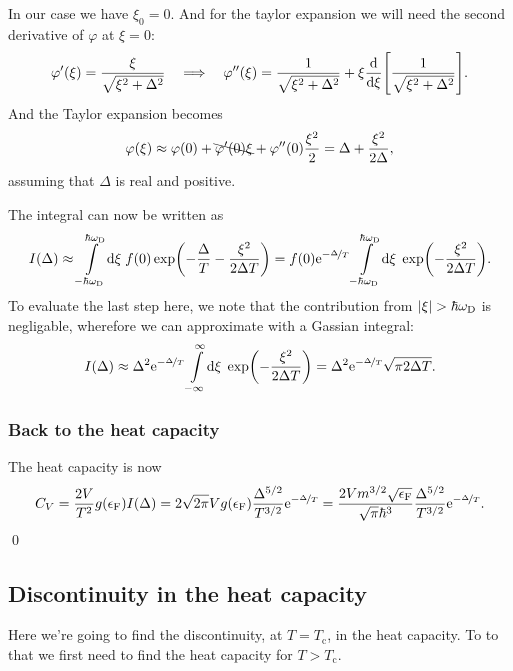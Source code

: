 \documentclass[11pt,letter, swedish, english
]{article}
\newcommand{\Tc}{\ensuremath{T_{\text{c}}}}
\newcommand{\eF}{\ensuremath{\epsilon_{\text{F}}}}
\newcommand{\wD}{\ensuremath{\omega_{\text{D}}}}
\begin{document}
In our case we have $\xi_0=0$. And for the taylor expansion we will
need the second derivative of $\varphi$ at $\xi=0$:
\begin{equation}
\varphi'(\xi)=\frac{\xi}{\sqrt{\xi^2+\Delta^2}}
\quad\Longrightarrow\quad
\varphi''(\xi)=\frac{1}{\sqrt{\xi^2+\Delta^2}}
+\xi\dv{\xi}\qty[\frac{1}{\sqrt{\xi^2+\Delta^2}}].
\end{equation}
And the Taylor expansion becomes
\begin{equation}
\varphi(\xi)\approx \varphi(0)+\bcancel{\varphi'(0)\xi}
+\varphi''(0)\frac{\xi^2}{2}
=\Delta+\frac{\xi^2}{2\Delta},
\end{equation}
assuming that $\Delta$ is real and positive.

The integral can now be written as
\begin{equation}
I(\Delta)\approx\int_{-\hbar\wD}^{\hbar\wD}\!\rd\xi\;f(0)
\exp(-\frac{\Delta}{T} - \frac{\xi^2}{2\Delta T})
=f(0)\ee^{-\nicefrac{\Delta}{T}}\int_{-\hbar\wD}^{\hbar\wD}\!\rd\xi\;
\exp(-\frac{\xi^2}{2\Delta T}).
\end{equation}
To evaluate the last step here, we note that the contribution from
$\abs{\xi}>\hbar\wD$ is negligable, wherefore we can approximate with a
Gassian integral:
\begin{equation}
I(\Delta)\approx \Delta^2\ee^{-\nicefrac{\Delta}{T}}
\int_{-\infty}^{\infty}\!\rd\xi\;
\exp(-\frac{\xi^2}{2\Delta T})
=\Delta^2\ee^{-\nicefrac{\Delta}{T}}
\sqrt{\pi2\Delta T}.
\end{equation}

\subsubsection*{Back to the heat capacity}
The heat capacity is now 
\begin{equation}\label{eq:1b_Cv}
C_V=\frac{2V}{T^2}g(\eF)I(\Delta)
=2\sqrt{2\pi}Vg(\eF)\frac{\Delta^{5/2}}{T^{3/2}}\ee^{-\nicefrac{\Delta}{T}}
=\frac{2Vm^{3/2}\sqrt{\eF}}{\sqrt{\pi}\hbar^3}
\frac{\Delta^{5/2}}{T^{3/2}}\ee^{-\nicefrac{\Delta}{T}}.
\end{equation}
\qed

\subsection{Discontinuity in the heat capacity}

Here we're going to find the discontinuity, at $T=\Tc$, in the heat
capacity. To to that we first need to find the heat capacity for
$T>\Tc$. 
\end{document}
